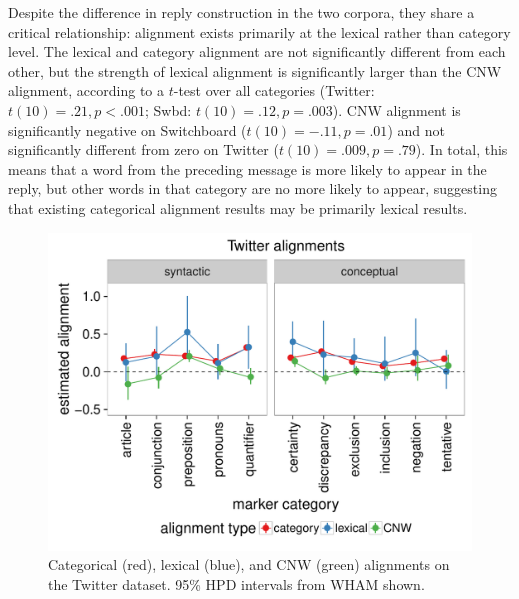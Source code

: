 \documentclass[11pt]{article}
\begin{document}
Despite the difference in reply construction in the two corpora, they share a critical relationship: alignment exists primarily at the lexical rather than category level.  The lexical and category alignment are not significantly different from each other, but the strength of lexical alignment is significantly larger than the CNW alignment, according to a $t$-test over all categories (Twitter: $t(10)=.21, p<.001$; Swbd: $t(10)=.12,p=.003$). CNW alignment is significantly negative on Switchboard ($t(10)=-.11, p=.01$) and not significantly different from zero on Twitter ($t(10)=.009, p=.79$). In total, this means that a word from the preceding message is more likely to appear in the reply, but other words in that category are no more likely to appear, suggesting that existing categorical alignment results may be primarily lexical results.  


\begin{figure}[t]
  \begin{center}
    \includegraphics[width=\columnwidth]{results/twitter_line.pdf}
  \end{center}
  \caption{Categorical (red), lexical (blue), and CNW (green) alignments on the Twitter dataset. 95\% HPD intervals from WHAM shown.}\label{fig:twitter-res}
\end{figure}
\end{document}
